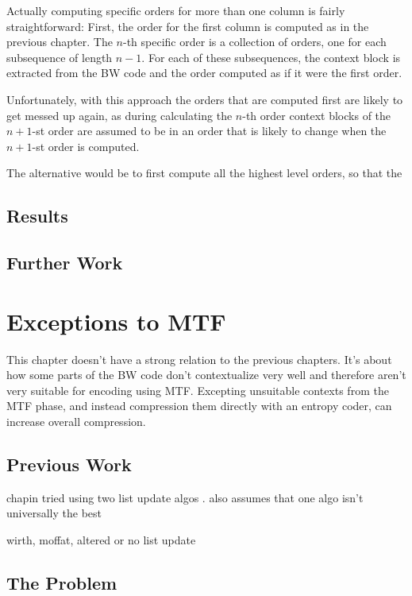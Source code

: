 \documentclass[a4paper]{scrreprt}
\begin{document}
Actually computing specific orders for more than one column is fairly
straightforward: First, the order for the first column is computed as in the
previous chapter. The \(n\)-th specific order is a collection of orders, one for
each subsequence of length \(n - 1\). For each of these subsequences, the
context block is extracted from the BW code and the order computed as if it were
the first order.

Unfortunately, with this approach the orders that are computed first are likely
to get messed up again, as during calculating the \(n\)-th order context blocks
of the \(n + 1\)-st order are assumed to be in an order that is likely to change
when the \(n + 1\)-st order is computed.

The alternative would be to first compute all the highest level orders, so that
the %

\section{Results}

\section{Further Work}


\chapter{Exceptions to MTF}


This chapter doesn't have a strong relation to the previous chapters. It's about
how some parts of the BW code don't contextualize very well and therefore aren't
very suitable for encoding using MTF. Excepting unsuitable contexts from the MTF
phase, and instead compression them directly with an entropy coder, can increase
overall compression.

\section{Previous Work}

chapin tried using two list update algos
\cite{chapin2000switching,chapin2001diss}. also assumes that one algo isn't
universally the best

wirth, moffat, altered or no list update \cite{wirth2001ranks}

\section{The Problem}





\end{document}
